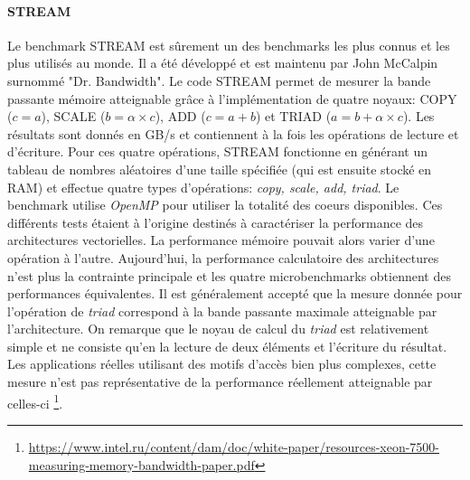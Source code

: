        
        
     
        \paragraph{STREAM \cite{McCalpin1995}} 
        
        
            Le benchmark STREAM est sûrement un des benchmarks les plus connus et les plus utilisés au monde. Il a été développé et est maintenu par John McCalpin surnommé "Dr. Bandwidth". Le code STREAM permet de mesurer la bande passante mémoire atteignable grâce à l'implémentation de quatre noyaux: COPY ($c=a$), SCALE ($b=\alpha \times c$), ADD ($c=a+b$) et TRIAD ($a=b+\alpha \times c$). Les résultats sont donnés en GB/s et contiennent à la fois les opérations de lecture et d'écriture. Pour ces quatre opérations, STREAM fonctionne en générant un tableau de nombres aléatoires d'une taille spécifiée (qui est ensuite stocké en RAM) et effectue quatre types d'opérations: \textit{copy, scale, add, triad}.  Le benchmark utilise \textit{OpenMP} pour utiliser la totalité des coeurs disponibles. Ces différents tests étaient à l'origine destinés à caractériser la performance des architectures vectorielles. La performance mémoire pouvait alors varier d'une opération à l'autre. Aujourd'hui, la performance calculatoire des architectures n'est plus la contrainte principale et les quatre microbenchmarks obtiennent des performances équivalentes. Il est généralement accepté que la mesure donnée pour l'opération de \textit{triad} correspond à la bande passante maximale atteignable par l'architecture. On remarque que le noyau de calcul du \textit{triad} est relativement simple et ne consiste qu'en la lecture de deux éléments et l'écriture du résultat. Les applications réelles utilisant des motifs d'accès bien plus complexes, cette mesure n'est pas représentative de la performance réellement atteignable par celles-ci \footnote{\url{https://www.intel.ru/content/dam/doc/white-paper/resources-xeon-7500-measuring-memory-bandwidth-paper.pdf}}.
            
